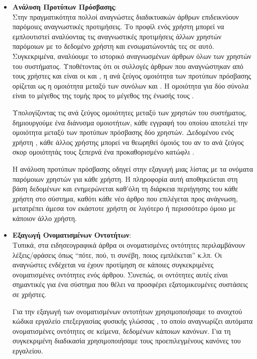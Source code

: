 {{{{{{{{\begin{itemize}
 \item \textbf{Ανάλυση Προτύπων Πρόσβασης}: \\ 
 Στην πραγματικότητα πολλοί αναγνώστες διαδικτυακών άρθρων επιδεικνύουν παρόμοιες αναγνωστικές προτιμήσεις. 
Το προφίλ ενός χρήστη μπορεί να εμπλουτιστεί αναλύοντας τις αναγνωστικές προτιμήσεις άλλων χρηστών παρόμοιων 
με το δεδομένο χρήστη και ενσωματώνοντάς τες σε αυτό. Συγκεκριμένα, αναλύουμε το ιστορικό αναγνωσμένων άρθρων 
όλων των χρηστών του συστήματος. Υποθέτοντας ότι οι συλλογές άρθρων που αναγνώστηκαν από τους χρήστες  {} 
και  {} είναι οι  {} και  {}, η ανά ζεύγος ομοιότητα των προτύπων πρόσβασης 
ορίζεται ως η {} ομοιότητα μεταξύ των συνόλων {} και  {}. 
Η ομοιότητα {} για δύο σύνολα είναι το μέγεθος της τομής προς το μέγεθος της ένωσής τους \cite{Jac02}. 

Υπολογίζοντας τις ανά ζεύγος ομοιότητες μεταξύ των χρηστών του συστήματος, δημιουργούμε ένα διάνυσμα ομοιοτήτων, 
κάθε εγγραφή του οποίου αποτελεί την {} ομοιότητα μεταξύ των προτύπων πρόσβασης δύο χρηστών. 
Δεδομένου ενός χρήστη {}, κάθε άλλος χρήστης μπορεί να θεωρηθεί όμοιός του αν το ανά ζεύγος σκορ ομοιότητάς τους 
ξεπερνά ένα προκαθορισμένο κατώφλι {}. 

Η ανάλυση προτύπων πρόσβασης οδηγεί στην εξαγωγή μιας λίστας με τα ονόματα παρόμοιων χρηστών για κάθε χρήστη. 
Η πληροφορία αυτή αποθηκεύεται στη βάση δεδομένων και ενημερώνεται καθ'όλη τη διάρκεια περιήγησης του κάθε χρήστη στο σύστημα, 
καθότι κάθε νέο άρθρο που επιλέγεται προς ανάγνωση, μετατρέπει άμεσα τον εκάστοτε χρήστη σε λιγότερο ή περισσότερο όμοιο με κάποιον άλλο χρήστη. 

 \item \textbf{Εξαγωγή Ονοματισμένων Οντοτήτων}: \\ 
 Τυπικά, στα ειδησεογραφικά άρθρα οι ονοματισμένες οντότητες περιλαμβάνουν λέξεις/φράσεις όπως “πότε, πού, τι συνέβη, ποιος εμπλέκεται” κ.λπ. 
Οι αναγνώστες ενδέχεται να έχουν προτίμηση σε κάποιες συγκεκριμένες ονοματισμένες οντότητες ενός άρθρου. Συνεπώς, οι οντότητες αυτές 
είναι σημαντικές για ένα σύστημα που θέλει να προσφέρει εξατομικευμένες συστάσεις σε χρήστες. 

Για την εξαγωγή των ονοματισμένων οντοτήτων χρησιμοποιήσαμε το ανοιχτού κώδικα εργαλείο επεξεργασίας φυσικής γλώσσας 
{}, το οποίο αναγνωρίζει αυτόματα ονοματισμένες οντότητες σε κείμενα, δεδομένων 
κάποιων κανόνων. Για τη συγκεκριμένη διαδικασία χρησιμοποιήσαμε τους προεπιλεγμένους κανόνες του εργαλείου. 


\end{itemize}}}}}}}}}

